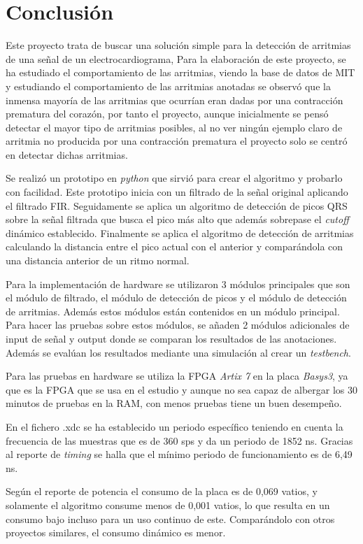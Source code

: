 \chapter{Conclusión}
Este proyecto trata de buscar una solución simple para la detección de arritmias de una señal de un electrocardiograma, Para la elaboración de este proyecto, 
se ha estudiado el comportamiento de las arritmias, viendo la base de datos de MIT y estudiando el comportamiento de las arritmias anotadas se observó que la inmensa mayoría de las arritmias que ocurrían eran dadas por una contracción prematura del corazón, por tanto el proyecto, aunque inicialmente se pensó detectar el mayor tipo de arritmias posibles, al no ver ningún ejemplo claro de arritmia no producida por una contracción prematura el proyecto solo se centró en detectar dichas arritmias.

Se realizó un prototipo en \textit{python} que sirvió para crear el algoritmo y probarlo con facilidad. Este prototipo inicia
con un filtrado de la señal original aplicando el filtrado FIR. Seguidamente se aplica un algoritmo de detección de 
picos QRS sobre la señal filtrada que busca el pico más alto que además sobrepase el \textit{cutoff} dinámico establecido. Finalmente
se aplica el algoritmo de detección de arritmias calculando la distancia entre el pico actual con el anterior y comparándola con una
distancia anterior de un ritmo normal.

Para la implementación de hardware se utilizaron 3 módulos principales que son el módulo de filtrado, el módulo de detección de picos 
y el módulo de detección de arritmias. Además estos módulos están contenidos en un módulo principal. Para hacer las pruebas sobre
estos módulos, se añaden 2 módulos adicionales de input de señal y output donde se comparan los resultados de las anotaciones. Además 
se evalúan los resultados mediante una simulación al crear un \textit{testbench}.

Para las pruebas en hardware se utiliza la FPGA \textit{Artix 7} en la placa \textit{Basys3}, ya que es la FPGA que se usa en el estudio y aunque no sea capaz de albergar los 30 minutos de pruebas en la RAM, con menos pruebas tiene un buen desempeño.

En el fichero .xdc se ha establecido un periodo específico teniendo en cuenta la frecuencia de las muestras que es de 360 sps y da un periodo de 1852 ns. Gracias al reporte de \textit{timing} se halla que el mínimo periodo de funcionamiento es de 6,49 ns.

Según el reporte de potencia el consumo de la placa es de 0,069 vatios, y solamente el algoritmo consume menos de 0,001 vatios, lo que resulta en un consumo bajo incluso para un uso continuo de este. Comparándolo con otros proyectos similares, el consumo dinámico es menor.

